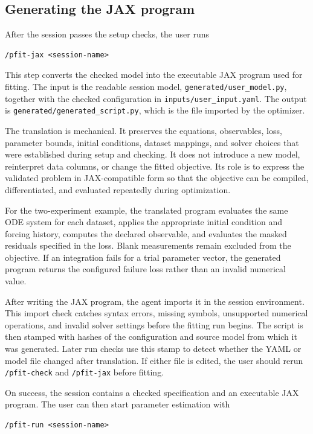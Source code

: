 \subsection{Generating the JAX program}
\label{sec:pfit-jax}

After the session passes the setup checks, the user runs

\begin{verbatim}
/pfit-jax <session-name>
\end{verbatim}

This step converts the checked model into the executable JAX program used for
fitting. The input is the readable session model,
\texttt{generated/user\_model.py}, together with the checked configuration in
\texttt{inputs/user\_input.yaml}. The output is
\texttt{generated/generated\_script.py}, which is the file imported by the
optimizer.

The translation is mechanical. It preserves the equations, observables, loss,
parameter bounds, initial conditions, dataset mappings, and solver choices that
were established during setup and checking. It does not introduce a new model,
reinterpret data columns, or change the fitted objective. Its role is to express
the validated problem in JAX-compatible form so that the objective can be
compiled, differentiated, and evaluated repeatedly during optimization.

For the two-experiment example, the translated program evaluates the same ODE
system for each dataset, applies the appropriate initial condition and forcing
history, computes the declared observable, and evaluates the masked residuals
specified in the loss. Blank measurements remain excluded from the objective.
If an integration fails for a trial parameter vector, the generated program
returns the configured failure loss rather than an invalid numerical value.

After writing the JAX program, the agent imports it in the session environment.
This import check catches syntax errors, missing symbols, unsupported numerical
operations, and invalid solver settings before the fitting run begins. The
script is then stamped with hashes of the configuration and source model from
which it was generated. Later run checks use this stamp to detect whether the
YAML or model file changed after translation. If either file is edited, the user
should rerun \texttt{/pfit-check} and \texttt{/pfit-jax} before fitting.

On success, the session contains a checked specification and an executable JAX
program. The user can then start parameter estimation with

\begin{verbatim}
/pfit-run <session-name>
\end{verbatim}
